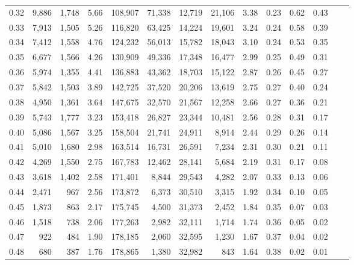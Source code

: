 \begin{tabular}{rrrrrrrrrrrrrr}
0.32 &   9,886 &  1,748 &    5.66 &  108,907 &   71,338 &  12,719 &  21,106 &  3.38 &  0.23 &  0.62 &      0.43 \\
0.33 &   7,913 &  1,505 &    5.26 &  116,820 &   63,425 &  14,224 &  19,601 &  3.24 &  0.24 &  0.58 &      0.39 \\
0.34 &   7,412 &  1,558 &    4.76 &  124,232 &   56,013 &  15,782 &  18,043 &  3.10 &  0.24 &  0.53 &      0.35 \\
0.35 &   6,677 &  1,566 &    4.26 &  130,909 &   49,336 &  17,348 &  16,477 &  2.99 &  0.25 &  0.49 &      0.31 \\
0.36 &   5,974 &  1,355 &    4.41 &  136,883 &   43,362 &  18,703 &  15,122 &  2.87 &  0.26 &  0.45 &      0.27 \\
0.37 &   5,842 &  1,503 &    3.89 &  142,725 &   37,520 &  20,206 &  13,619 &  2.75 &  0.27 &  0.40 &      0.24 \\
0.38 &   4,950 &  1,361 &    3.64 &  147,675 &   32,570 &  21,567 &  12,258 &  2.66 &  0.27 &  0.36 &      0.21 \\
0.39 &   5,743 &  1,777 &    3.23 &  153,418 &   26,827 &  23,344 &  10,481 &  2.56 &  0.28 &  0.31 &      0.17 \\
0.40 &   5,086 &  1,567 &    3.25 &  158,504 &   21,741 &  24,911 &   8,914 &  2.44 &  0.29 &  0.26 &      0.14 \\
0.41 &   5,010 &  1,680 &    2.98 &  163,514 &   16,731 &  26,591 &   7,234 &  2.31 &  0.30 &  0.21 &      0.11 \\
0.42 &   4,269 &  1,550 &    2.75 &  167,783 &   12,462 &  28,141 &   5,684 &  2.19 &  0.31 &  0.17 &      0.08 \\
0.43 &   3,618 &  1,402 &    2.58 &  171,401 &    8,844 &  29,543 &   4,282 &  2.07 &  0.33 &  0.13 &      0.06 \\
0.44 &   2,471 &    967 &    2.56 &  173,872 &    6,373 &  30,510 &   3,315 &  1.92 &  0.34 &  0.10 &      0.05 \\
0.45 &   1,873 &    863 &    2.17 &  175,745 &    4,500 &  31,373 &   2,452 &  1.84 &  0.35 &  0.07 &      0.03 \\
0.46 &   1,518 &    738 &    2.06 &  177,263 &    2,982 &  32,111 &   1,714 &  1.74 &  0.36 &  0.05 &      0.02 \\
0.47 &     922 &    484 &    1.90 &  178,185 &    2,060 &  32,595 &   1,230 &  1.67 &  0.37 &  0.04 &      0.02 \\
0.48 &     680 &    387 &    1.76 &  178,865 &    1,380 &  32,982 &     843 &  1.64 &  0.38 &  0.02 &      0.01 \\

\end{tabular}
